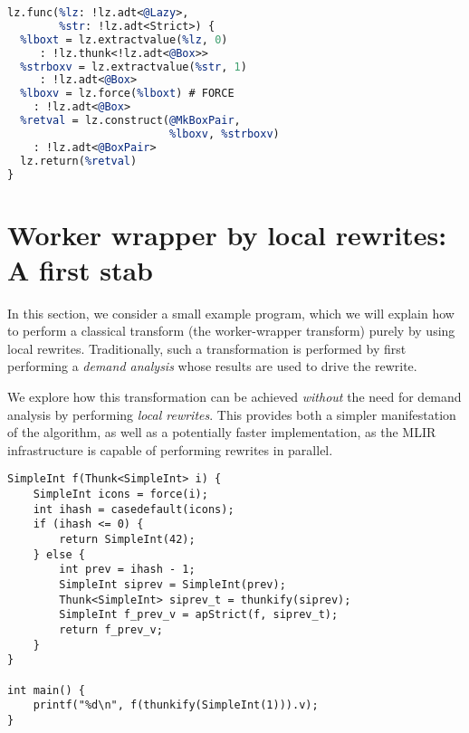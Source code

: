 \documentclass[sigplan,\review anonymous]{acmart}
\newcommand{\lz}{\texttt{lz} }
\begin{document}
\begin{lstlisting}[language=llvm, caption=\lz dialect encoding of the above program where there is a clear indication of the thunk being forced]
lz.func(%lz: !lz.adt<@Lazy>, 
        %str: !lz.adt<Strict>) {
  %lboxt = lz.extractvalue(%lz, 0)
     : !lz.thunk<!lz.adt<@Box>>
  %strboxv = lz.extractvalue(%str, 1)
     : !lz.adt<@Box>
  %lboxv = lz.force(%lboxt) # FORCE
    : !lz.adt<@Box>
  %retval = lz.construct(@MkBoxPair, 
                         %lboxv, %strboxv)
    : !lz.adt<@BoxPair>
  lz.return(%retval)
}
\end{lstlisting}

\section{Worker wrapper by local rewrites: A first stab}
In this section, we consider a small example program, which we will explain
how to perform a classical transform (the worker-wrapper transform) purely
by using local rewrites. Traditionally, such a transformation is performed
by first performing a \emph{demand analysis} whose results are used
to drive the rewrite.

We explore how this transformation can be achieved \emph{without} the need
for demand analysis by performing \emph{local rewrites}. This provides
both a simpler manifestation of the algorithm, as well as a potentially 
faster implementation, as the MLIR infrastructure is capable of performing
rewrites in parallel.
{\footnotesize
\begin{lstlisting}[caption=initial source code]
SimpleInt f(Thunk<SimpleInt> i) {
    SimpleInt icons = force(i);
    int ihash = casedefault(icons);
    if (ihash <= 0) {
        return SimpleInt(42);
    } else {
        int prev = ihash - 1;
        SimpleInt siprev = SimpleInt(prev);
        Thunk<SimpleInt> siprev_t = thunkify(siprev);
        SimpleInt f_prev_v = apStrict(f, siprev_t);
        return f_prev_v;
    }
}

int main() {
    printf("%d\n", f(thunkify(SimpleInt(1))).v);
}
\end{lstlisting}
}
\end{document}
